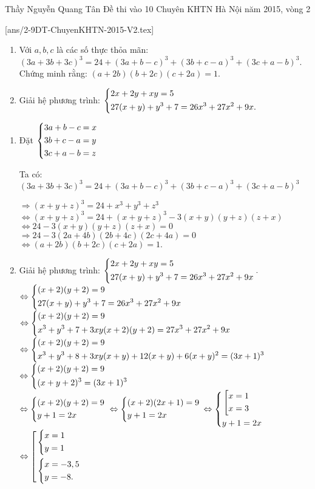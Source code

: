 \begin{name}
{Thầy  Nguyễn Quang Tân}
{Đề thi vào 10 Chuyên KHTN Hà Nội năm 2015, vòng 2}
\end{name}
\setcounter{ex}{0}
[ans/2-9DT-ChuyenKHTN-2015-V2.tex]
\begin{ex}%
    \hfill
    \begin{enumerate}
\item Với $a, b, c$ là các số thực thỏa mãn:
$(3a+3b+3c)^3=24+(3a+b-c)^3+(3b+c-a)^3+(3c+a-b)^3$.
Chứng minh rằng: $(a+2b)(b+2c)(c+2a)=1$.
\item Giải hệ phương trình:
$\left\{\begin{aligned}&2x+2y+xy=5\\&27(x+y)+y^3+7=26x^3+27x^2+9x.\end{aligned}\right.$
\end{enumerate}
\loigiai
    {
    \begin{enumerate}
   \item Đặt $\left\{\begin{aligned}&3a+b-c=x\\&3b+c-a=y\\&3c+a-b=z\end{aligned}\right.$
   
   Ta có: $(3a+3b+3c)^3=24+(3a+b-c)^3+(3b+c-a)^3+(3c+a-b)^3$

$\Rightarrow (x+y+z)^3=24+x^3+y^3+z^3$\\
$\Leftrightarrow (x+y+z)^3=24+(x+y+z)^3-3(x+y)(y+z)(z+x)$\\
$\Leftrightarrow 24-3(x+y)(y+z)(z+x)=0$\\
$\Rightarrow 24-3(2a+4b)(2b+4c)(2c+4a)=0$\\
$\Leftrightarrow (a+2b)(b+2c)(c+2a)=1.$

\item Giải hệ phương trình:
$\left\{\begin{aligned}&2x+2y+xy=5\\&27(x+y)+y^3+7=26x^3+27x^2+9x\end{aligned}\right..$\\
$\Leftrightarrow \left\{\begin{aligned}&(x+2)(y+2)=9\\&27(x+y)+y^3+7=26x^3+27x^2+9x\end{aligned}\right.$\\
$\Leftrightarrow \left\{\begin{aligned}&(x+2)(y+2)=9\\& x^3+y^3+7+3xy(x+2)(y+2)=27x^3+27x^2+9x\end{aligned}\right.$\\
$\Leftrightarrow \left\{\begin{aligned}&(x+2)(y+2)=9\\&x^3+y^3+8+3xy(x+y)+12(x+y)+6(x+y)^2=(3x+1)^3\end{aligned}\right.$\\
$\Leftrightarrow \left\{\begin{aligned}&(x+2)(y+2)=9\\&(x+y+2)^3=(3x+1)^3\end{aligned}\right.$\\
$\Leftrightarrow \left\{\begin{aligned}&(x+2)(y+2)=9\\&y+1=2x\end{aligned}\right.$
$\Leftrightarrow \left\{\begin{aligned}&(x+2)(2x+1)=9\\&y+1=2x\end{aligned}\right.$
$\Leftrightarrow \left\{\begin{aligned}&\left[\begin{aligned}&x=1\\&x=3\end{aligned}\right.\\&y+1=2x\end{aligned}\right.$
$\Leftrightarrow \left[\begin{aligned}&\left\{\begin{aligned}&x=1\\&y=1\end{aligned}\right.\\&\left\{\begin{aligned}&x=-3,5\\&y=-8.\end{aligned}\right.\end{aligned}\right.$
    \end{enumerate}
    }
\end{ex}

